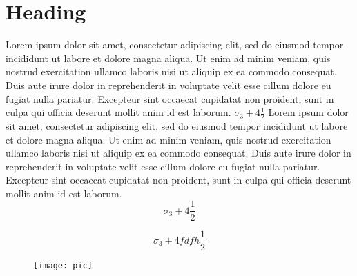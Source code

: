 \documentclass[10pt, a4paper]{article}
\begin{document}
\section{Heading}
\label{src:heading}

Lorem ipsum dolor sit amet, consectetur adipiscing elit, sed do eiusmod tempor incididunt ut labore et dolore magna aliqua. Ut enim ad minim veniam, quis nostrud exercitation ullamco laboris nisi ut aliquip ex ea commodo consequat. Duis aute irure dolor in reprehenderit in voluptate velit esse cillum dolore eu fugiat nulla pariatur. Excepteur sint occaecat cupidatat non proident, sunt in culpa qui officia deserunt mollit anim id est laborum. $ \sigma_3 + 4 \frac{1}{2} $ Lorem ipsum dolor sit amet, consectetur adipiscing elit, sed do eiusmod tempor incididunt ut labore et dolore magna aliqua. Ut enim ad minim veniam, quis nostrud exercitation ullamco laboris nisi ut aliquip ex ea commodo consequat. Duis aute irure dolor in reprehenderit in voluptate velit esse cillum dolore eu fugiat nulla pariatur. Excepteur sint occaecat cupidatat non proident, sunt in culpa qui officia deserunt mollit anim id est laborum.
$$ \sigma_3 + 4 \frac{1}{2} $$


\begin{equation}
    \sigma_3 + 4f dfh \frac{1}{2}
\end{equation}

\begin{figure}[h!]
	\texttt{[image: pic]}
\end{figure}


\end{document}
